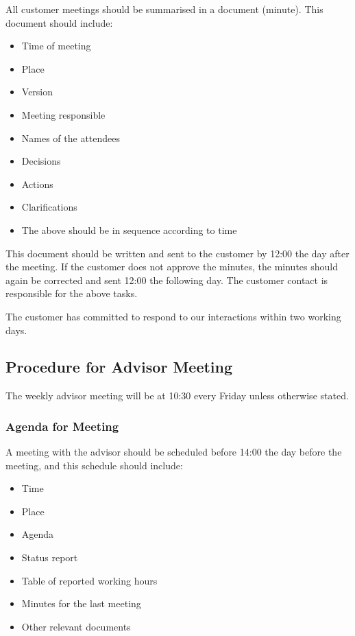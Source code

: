 All customer meetings should be summarised in a document (minute). This document should include:
\begin{itemize}
	\item Time of meeting
	\item Place
	\item Version
	\item Meeting responsible
	\item Names of the attendees
	\item Decisions
	\item Actions
	\item Clarifications
	\item The above should be in sequence according to time
\end{itemize}

This document should be written and sent to the customer by 12:00 the day after the meeting. If the customer does not approve the minutes, the minutes should again be corrected and sent 12:00 the following day. The customer contact is responsible for the above tasks.

The customer has committed to respond to our interactions within two working days.

\subsection{Procedure for Advisor Meeting}
The weekly advisor meeting will be at 10:30 every Friday unless otherwise stated.

\subsubsection{Agenda for Meeting}
A meeting with the advisor should be scheduled before 14:00 the day before the meeting, and this schedule should include:
\begin{itemize}
	\item Time
	\item Place
	\item Agenda
	\item Status report
	\item Table of reported working hours
	\item Minutes for the last meeting
	\item Other relevant documents
\end{itemize}

